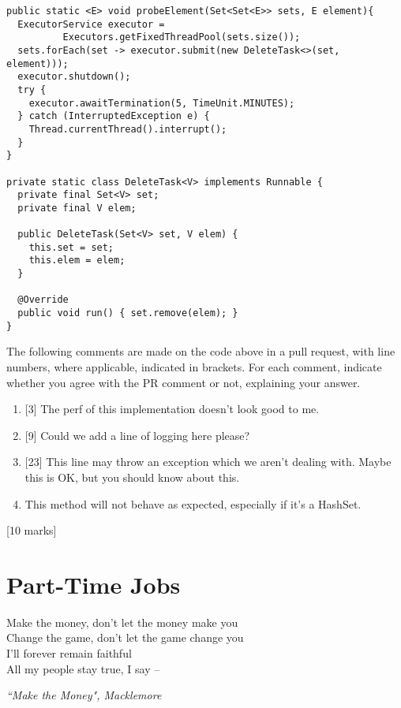 \documentclass[12pt, a4paper]{article}
\begin{document}
\begin{enumerate}
\begin{enumerate}
\lstset{
  language = Java,
  basicstyle = \ttfamily \footnotesize,
  numbers = left,
  numberstyle = \scriptsize,
  showstringspaces = false
}
\begin{lstlisting}
public static <E> void probeElement(Set<Set<E>> sets, E element){
  ExecutorService executor = 
          Executors.getFixedThreadPool(sets.size());
  sets.forEach(set -> executor.submit(new DeleteTask<>(set, element)));
  executor.shutdown();
  try {
    executor.awaitTermination(5, TimeUnit.MINUTES);
  } catch (InterruptedException e) {
    Thread.currentThread().interrupt();
  }
}

private static class DeleteTask<V> implements Runnable {
  private final Set<V> set;
  private final V elem;
  
  public DeleteTask(Set<V> set, V elem) {
    this.set = set;
    this.elem = elem;
  }

  @Override
  public void run() { set.remove(elem); }
}
\end{lstlisting}
\lstset{
  language = C,
  basicstyle = \ttfamily \small,
  numbers = left,
  numberstyle = \footnotesize,
  showstringspaces = false
}

The following comments are made on the code above in a pull request, with line numbers, where applicable, indicated in brackets. For each comment, indicate whether you agree with the PR comment or not, explaining your answer.
\begin{enumerate}
\item \hspace{0pt} [3] The perf of this implementation doesn't look good to me.
\item \hspace{0pt} [9] Could we add a line of logging here please?
\item \hspace{0pt} [23] This line may throw an exception which we aren't dealing with. Maybe this is OK, but you should know about this.
\item \hspace{0pt} This method will not behave as expected, especially if it's a HashSet.
\end{enumerate}
\end{enumerate}
[10 marks]

\end{enumerate}

\section{Part-Time Jobs}
\epigraph{Make the money, don't let the money make you \\
Change the game, don't let the game change you \\
I'll forever remain faithful \\
All my people stay true, I say --
}{\textit{``Make the Money", Macklemore}}
\end{document}
